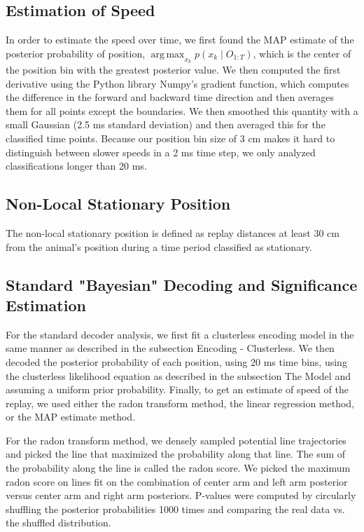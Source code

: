 \documentclass[9pt,lineno]{elife}
\DeclareMathOperator*{\argmax}{arg\,max}
\begin{document}
\subsection*{Estimation of Speed}
In order to estimate the speed over time, we first found the MAP estimate of the posterior probability of position, $\argmax_{x_k} p(x_{k} \mid O_{1:T})$, which is the center of the position bin with the greatest posterior value. We then computed the first derivative using the Python library Numpy's gradient function, which computes the difference in the forward and backward time direction and then averages them for all points except the boundaries. We then smoothed this quantity with a small Gaussian (2.5 ms standard deviation) and then averaged this for the classified time points. Because our position bin size of 3 cm makes it hard to distinguish between slower speeds in a 2 ms time step, we only analyzed classifications longer than 20 ms.

\subsection*{Non-Local Stationary Position}
The non-local stationary position is defined as replay distances at least 30 cm from the animal's position during a time period classified as stationary.

\subsection*{Standard "Bayesian" Decoding and Significance Estimation}
For the standard decoder analysis, we first fit a clusterless encoding model in the same manner as described in the subsection Encoding - Clusterless. We then decoded the posterior probability of each position, using 20 ms time bins, using the clusterless likelihood equation as described in the subsection The Model and assuming a uniform prior probability. Finally, to get an estimate of speed of the replay, we used either the radon transform method, the linear regression method, or the MAP estimate method.

For the radon transform method, we densely sampled potential line trajectories and picked the line that maximized the probability along that line. The sum of the probability along the line is called the radon score. We picked the maximum radon score on lines fit on the combination of center arm and left arm posterior versus center arm and right arm posteriors. P-values were computed by circularly shuffling the posterior probabilities 1000 times and comparing the real data vs. the shuffled distribution.
\end{document}
